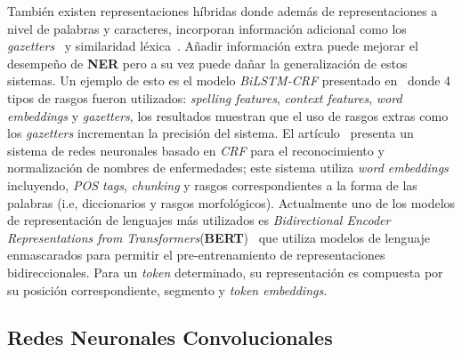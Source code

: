 Tambi\'en existen representaciones h\'ibridas donde adem\'as de representaciones a nivel de palabras y caracteres, incorporan informaci\'on adicional como los \emph{gazetters}~\cite{huang2015bidirectional} y similaridad l\'exica~\cite{ghaddar2018robust}. A\~nadir informaci\'on extra puede mejorar el desempe\~no de \textbf{NER} pero a su vez puede da\~nar la generalizaci\'on de estos sistemas. Un ejemplo de esto es el modelo \emph{BiLSTM-CRF} presentado en~\cite{huang2015bidirectional} donde 4 tipos de rasgos fueron utilizados: \emph{spelling features}, \emph{context features}, \emph{word embeddings} y \emph{gazetters}, los resultados muestran que el uso de rasgos extras como los \emph{gazetters} incrementan la precisi\'on del sistema. El art\'iculo~\cite{wei2016disease} presenta un sistema de redes neuronales basado en \emph{CRF} para el reconocimiento y normalizaci\'on de nombres de enfermedades; este sistema utiliza \emph{word embeddings} incluyendo, \emph{POS tags}, \emph{chunking} y rasgos correspondientes a la forma de las palabras (i.e, diccionarios y rasgos morfol\'ogicos). Actualmente uno de los modelos de representaci\'on de lenguajes m\'as utilizados es \emph{Bidirectional Encoder Representations from Transformers}(\textbf{BERT})~\cite{devlin2018bert} que utiliza modelos de lenguaje enmascarados para permitir el pre-entrenamiento de representaciones bidireccionales. Para un \emph{token} determinado, su representaci\'on es compuesta por su posici\'on correspondiente, segmento y \emph{token embeddings}.


\subsection{Redes Neuronales Convolucionales}
%

